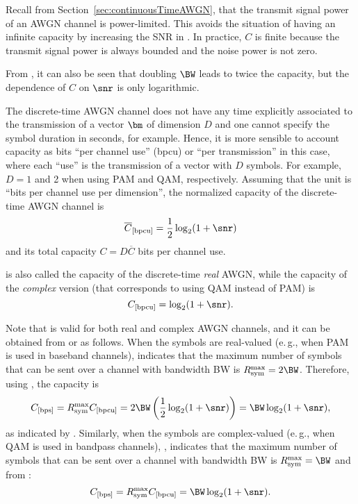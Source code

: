 Recall from Section~\ref{sec:continuousTimeAWGN}, that the transmit signal power of an AWGN channel is power-limited. This avoids the situation of having an infinite capacity by increasing the SNR in . In practice, $C$ is finite because the transmit signal power is always bounded and the noise power is not zero.

From , it can also be seen that doubling $\BW$ leads to twice the capacity, but the dependence of $C$ on $\snr$ is only logarithmic. 

The discrete-time AWGN channel does not have any time explicitly associated to the transmission of a vector $\bm$ of dimension $D$ and one cannot specify the symbol duration in seconds, for example. Hence, it is more sensible to account capacity as bits ``per channel use'' (bpcu) or ``per transmission'' in this case, where each ``use'' is the transmission of a vector with $D$ symbols. For example, $D=1$ and 2 when using PAM and QAM, respectively. Assuming that the unit is ``bits per channel use per dimension'', the normalized capacity of the discrete-time AWGN channel is
\begin{equation}
\overline C_{[\textrm{bpcu}]} = \frac 1 2 \log_2 (1 + \snr)
\label{eq:capacityDiscreteAWGN}
\end{equation}
and its total capacity $C = D \overline C$ bits per channel use. 

 is also called the capacity of the discrete-time \emph{real} AWGN, while the capacity of the \emph{complex} version (that corresponds to using QAM instead of PAM) is
\begin{equation}
C_{[\textrm{bpcu}]} = \log_2 (1 + \snr).
\label{eq:capacityDiscreteAWGNComplex}
\end{equation}

Note that  is valid for both real and complex AWGN channels, and it can be obtained from  or  as follows. When the symbols are real-valued (e.\,g., when PAM is used in baseband channels),  indicates that the maximum number of symbols that can be sent over a channel with bandwidth BW is $R_{\textrm{sym}}^{\textrm{max}} = 2 \BW$. Therefore, using , the capacity is 
\[
C_{[\textrm{bps}]} = R_{\textrm{sym}}^{\textrm{max}} C_{[\textrm{bpcu}]} = 2 \BW \left( \frac 1 2 \log_2 (1 + \snr) \right) = \BW \log_2 (1 + \snr),
\]
as indicated by .
Similarly, when the symbols are complex-valued (e.\,g., when QAM is used in bandpass channels), , indicates that the maximum number of symbols that can be sent over a channel with bandwidth BW is $R_{\textrm{sym}}^{\textrm{max}} = \BW$ and from :
\[
C_{[\textrm{bps}]} = R_{\textrm{sym}}^{\textrm{max}} C_{[\textrm{bpcu}]} = \BW \log_2 (1 + \snr).
\]

